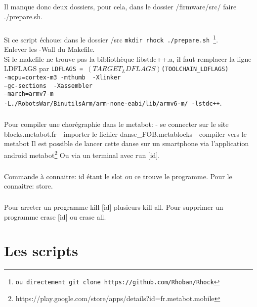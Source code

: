 \documentclass[10pt,a4paper]{report}
\begin{document}
\begin{appendices}
\paragraph{}
Il manque donc deux dossiers, pour cela, dans le dossier /firmware/src/ faire ./prepare.sh.
\paragraph{}
Si ce script échoue: dans le dossier /src \texttt{mkdir rhock ./prepare.sh \footnote{ou directement git clone https://github.com/Rhoban/Rhock}}. \\
Enlever les -Wall du Makefile.\\
Si le makefile ne trouve pas la bibliothèque libstdc++.a, il faut remplacer la ligne LDFLAGS par  
\texttt{LDFLAGS = $(TARGET_LDFLAGS) $(TOOLCHAIN\_LDFLAGS)\\ 
-mcpu=cortex-m3 -mthumb \ -Xlinker\\ 
--gc-sections \ -Xassembler\\
--march=armv7-m \ \\
-L./RobotsWar/BinutilsArm/arm-none-eabi/lib/armv6-m/ -lstdc++}.
\paragraph{}
Pour compiler une chorégraphie dans le metabot:
- se connecter sur le site blocks.metabot.fr
- importer le fichier danse\_FOB.metablocks
- compiler vers le metabot
Il est possible de lancer cette danse sur un smartphone via l'application android metabot\footnote{https://play.google.com/store/apps/details?id=fr.metabot.mobile} Ou via un terminal avec run [id].
\paragraph{}
Commande à connaitre:
id étant le slot ou ce trouve le programme. Pour le connaitre: store.
\paragraph{}
Pour arreter un programme kill [id] plusieurs kill all. Pour supprimer un programme erase [id] ou erase all.

\chapter{Les scripts} 



\end{appendices}
\end{document}
